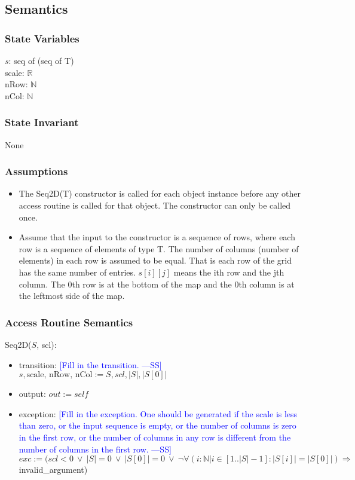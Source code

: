 \documentclass[12pt]{article}
\newcommand{\authornote}[3]{\textcolor{#1}{[#3 ---#2]}}
\newcommand{\authornote}[3]{}
\newcommand{\wss}[1]{\authornote{blue}{SS}{#1}}
\begin{document}
\subsection* {Semantics}

\subsubsection* {State Variables}

$s$: seq of (seq of T)\\
scale: $\mathbb{R}$\\
nRow: $\mathbb{N}$\\
nCol: $\mathbb{N}$

\subsubsection* {State Invariant}

None

\subsubsection* {Assumptions}

\begin{itemize}
\item The Seq2D(T) constructor is called for each object instance before any
other access routine is called for that object.  The constructor can only be
called once.
\item Assume that the input to the constructor is a sequence of rows, where each
  row is a sequence of elements of type T.  The number of columns (number of
  elements) in each row is assumed to be equal. That is each row
  of the grid has the same number of entries.  $s[i][j]$ means the ith row and
  the jth column.  The 0th row is at the bottom of the map and the 0th column
  is at the leftmost side of the map.
\end{itemize}

\subsubsection* {Access Routine Semantics}

Seq2D($S$, scl):
\begin{itemize}
\item transition: \wss{Fill in the transition.} $s, \mbox{scale, nRow, nCol} := S, scl, |S|, |S[0]|$
\item output: $\mathit{out} := \mathit{self}$
\item exception: \wss{Fill in the exception.  One should be generated if the
    scale is less than zero, or the input sequence is empty, or the number of
    columns is zero in the first row, or the number of columns in any row is
    different from the number of columns in the first row.}  $exc := (scl < 0 \ \lor \ |S| = 0 \ \lor \ |S[0]| = 0 \ \lor \ \lnot \forall (i : \mathbb{N} | i \in [1..|S| -1] : |S[i]| = |S[0]|) \Rightarrow$ invalid\_argument)
\end{itemize}
\end{document}
